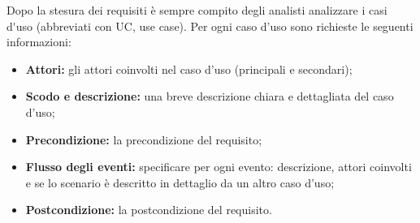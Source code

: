 Dopo la stesura dei requisiti è sempre compito degli analisti analizzare i \gls{casi d'uso} (abbreviati con UC, use case).
Per ogni caso d'uso sono richieste le seguenti informazioni:
\begin{itemize}
	\item \textbf{Attori:} gli attori coinvolti nel caso d'uso (principali e secondari);
	\item \textbf{Scodo e descrizione:} una breve descrizione chiara e dettagliata del caso d'uso;
	\item \textbf{Precondizione:} la precondizione del requisito;
	\item \textbf{Flusso degli eventi:} specificare per ogni evento: descrizione, attori coinvolti e se lo scenario è descritto in dettaglio da un altro caso d'uso;
	\item \textbf{Postcondizione:} la postcondizione del requisito.
\end{itemize}
\newpage
